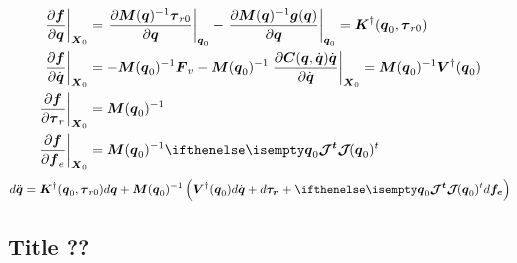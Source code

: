 \documentclass[12pt, a4paper]{article} %
\numberwithin{equation}{section}
\begin{document}
	\begin{equation} \label{eq_linearization_cst_terms}
	\begin{split}
		\left. \frac{\partial \vect{f}}{\partial \vect{q} } \right|_{\matr{X}_0} &= \left. \frac{\partial \matr{M}(\vect{q})^{-1} \vect{\tau}_{r0}}{\partial \vect{q} } \right|_{\vect{q}_0} - \left. \frac{\partial \matr{M}(\vect{q})^{-1} \vect{g}(\vect{q})}{\partial \vect{q} } \right|_{\vect{q}_0} = \matr{K}^\dagger(\vect{q}_0, \vect{\tau}_{r0}) \\
		\left. \frac{\partial \vect{f}}{\partial \dot{\vect{q}} } \right|_{\matr{X}_0} &= -\matr{M}(\vect{q}_0)^{-1}\matr{F}_v - \matr{M}(\vect{q}_0)^{-1} \left. \frac{\partial \matr{C}(\vect{q}, \dot{\vect{q}}) \dot{\vect{q}}}{\partial \dot{\vect{q}} } \right|_{\matr{X}_0} = \matr{M}(\vect{q}_0)^{-1} \matr{V}^\dagger(\vect{q}_0)\\
		\left. \frac{\partial \vect{f}}{\partial \vect{\tau}_r} \right|_{\matr{X}_0} &= \matr{M}(\vect{q}_0)^{-1} \\		
		\left. \frac{\partial \vect{f}}{\partial \vect{f}_e} \right|_{\matr{X}_0} &= \matr{M}(\vect{q}_0)^{-1} \jacobian{\vect{q}_0}{}{t} 	
	\end{split}
	\end{equation}
	\begin{equation} \label{eq_linearization_dyn_complete}
		d\ddot{\vect{q}} = \matr{K}^\dagger(\vect{q}_0, \vect{\tau}_{r0})  d\vect{q} + %
		\matr{M}(\vect{q}_0)^{-1} \left( \matr{V}^\dagger(\vect{q}_0) d\dot{\vect{q}} + %
		d\vect{\tau_r} + %
		\jacobian{\vect{q}_0}{}{t} d\vect{f_e} \right)
	\end{equation}	
	\subsection{Title ??}
\end{document}

